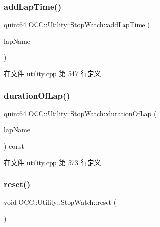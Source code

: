 \subsubsection{\texorpdfstring{add\+Lap\+Time()}{addLapTime()}}
{\footnotesize\ttfamily quint64 O\+C\+C\+::\+Utility\+::\+Stop\+Watch\+::add\+Lap\+Time (\begin{DoxyParamCaption}\item[{const Q\+String \&}]{lap\+Name }\end{DoxyParamCaption})}



在文件 utility.\+cpp 第 547 行定义.

\mbox{\label{class_o_c_c_1_1_utility_1_1_stop_watch_a88ed0ba1f54a37aaf803eb644ebbd631}} 
\subsubsection{\texorpdfstring{duration\+Of\+Lap()}{durationOfLap()}}
{\footnotesize\ttfamily quint64 O\+C\+C\+::\+Utility\+::\+Stop\+Watch\+::duration\+Of\+Lap (\begin{DoxyParamCaption}\item[{const Q\+String \&}]{lap\+Name }\end{DoxyParamCaption}) const}



在文件 utility.\+cpp 第 573 行定义.

\mbox{\label{class_o_c_c_1_1_utility_1_1_stop_watch_aa33acb40dafb0abb7d0d818974be48a2}} 
\subsubsection{\texorpdfstring{reset()}{reset()}}
{\footnotesize\ttfamily void O\+C\+C\+::\+Utility\+::\+Stop\+Watch\+::reset (\begin{DoxyParamCaption}{ }\end{DoxyParamCaption})}




